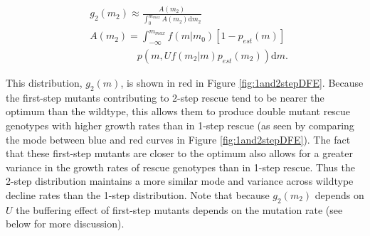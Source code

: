 \documentclass[9pt,twocolumn,twoside,lineno]{gsajnl}
\begin{document}
\begin{equation}\label{eq:g2m}
\begin{aligned}
&g_2(m_2) \approx \frac{A(m_2)}{\int_0^{m_{max}} A(m_2) \mathrm{d}m_2} \\
&A(m_2) = \int_{-\infty}^{m_{max}} f(m|m_0) \left[ 1 - p_{est}(m) \right] \\
&\hspace{2cm}p(m,U f(m_2|m) p_{est}(m_2))\mathrm{d}m.
\end{aligned}
\end{equation}

\noindent This distribution, $g_2(m)$, is shown in red in Figure \ref{fig:1and2stepDFE}.
Because the first-step mutants contributing to 2-step rescue tend to be nearer the optimum than the wildtype, this allows them to produce double mutant rescue genotypes with higher growth rates than in 1-step rescue (as seen by comparing the mode between blue and red curves in Figure \ref{fig:1and2stepDFE}).
The fact that these first-step mutants are closer to the optimum also allows for a greater variance in the growth rates of rescue genotypes than in 1-step rescue.
Thus the 2-step distribution maintains a more similar mode and variance across wildtype decline rates than the 1-step distribution. %
Note that because $g_2(m_2)$ depends on $U$ the buffering effect of first-step mutants depends on the mutation rate (see  below for more discussion).
\end{document}
